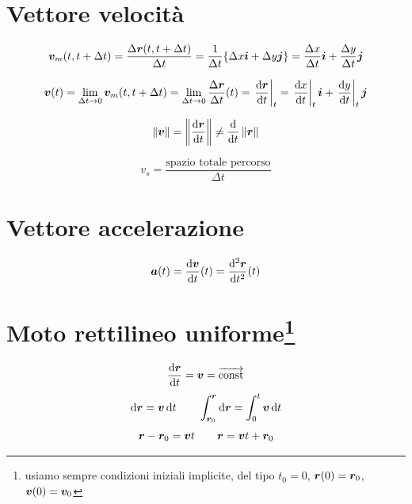 \section{Vettore velocità}
\begin{Def}
\[\boldsymbol{v}_m(t,t+\Delta t)=\frac{\Delta\boldsymbol{r}(t,t+\Delta t)}{\Delta
t}=\frac{1}{\Delta t}\{\Delta x\boldsymbol{i}+\Delta y\boldsymbol{j}\}=\frac{\Delta x}{\Delta t}\boldsymbol{i}+\frac{\Delta y}{\Delta t}\boldsymbol{j}\]
\end{Def}
\begin{Def}
\begin{equation*}\boldsymbol{v}(t)=\lim_{\Delta t\rightarrow 0}\boldsymbol{v}_m(t,t+\Delta t)=\lim_{\Delta t\rightarrow 0} \frac{\Delta\boldsymbol{r}}{\Delta t}(t)={\left.\frac{\mathrm{d} \boldsymbol{r}}{\mathrm{d} t}\right|_t}=\left.\frac{\mathrm{d} x}{\mathrm{d} t}\right|_t\boldsymbol{i}+\left.\frac{\mathrm{d} y}{\mathrm{d} t}\right|_t\boldsymbol{j}\end{equation*}
\end{Def}
\begin{equation*}\left\lVert\boldsymbol{v}\right\rVert=\left\lVert\frac{\mathrm{d}\boldsymbol{r}}{\mathrm{d} t}\right\rVert\neq\frac{\mathrm{d}}{\mathrm{d} t}\left\lVert\boldsymbol{r}\right\rVert\end{equation*}
\begin{Def}
\begin{equation*}v_s=\frac{\text{spazio totale percorso}}{\Delta t}\end{equation*}
\end{Def}
\section{Vettore accelerazione}
\begin{Def}
\begin{equation*}\boldsymbol{a}(t)=\frac{\mathrm{d} \boldsymbol{v}}{\mathrm{d} t}(t)={\frac{\mathrm{d}^2 \boldsymbol{r}}{\mathrm{d} t^2}}(t)\end{equation*}
\end{Def}
\section[Moto rettilineo uniforme]{Moto rettilineo uniforme\protect\footnote{usiamo sempre condizioni iniziali implicite, del tipo $t_0=0$, $\boldsymbol{r}(0)=\boldsymbol{r}_0$, $\boldsymbol{v}(0)=\boldsymbol{v}_0$}}
\begin{equation*}\frac{\mathrm{d}\boldsymbol{r}}{\mathrm{d} t}=\boldsymbol{v}=\overrightarrow{\text{const}}\end{equation*}
\begin{equation*}\mathrm{d}\boldsymbol{r}=\boldsymbol{v}\,\mathrm{d} t\qquad\int_{\boldsymbol{r}_0}^{\boldsymbol{r}}\mathrm{d}\boldsymbol{r}=\int_0^t\boldsymbol{v}\,\mathrm{d} t\end{equation*}
\begin{equation*}\boldsymbol{r}-\boldsymbol{r}_0=\boldsymbol{v} t\qquad\boldsymbol{r}=\boldsymbol{v} t+\boldsymbol{r}_0\end{equation*}
